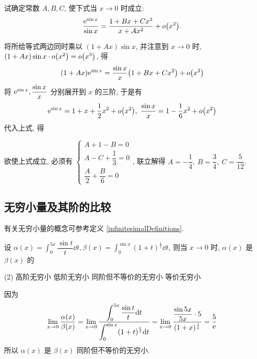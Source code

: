 \begin{example}
    试确定常数 $A,B,C$, 使下式当 $x\to0 $ 时成立:
    $$\dfrac{\mathrm{e}^{\sin x}}{\sin x}=\dfrac{1+Bx+Cx^2}{x+Ax^2}+o\qty(x^2).$$
\end{example}
\begin{solution}
    将所给等式两边同时乘以 $(1+Ax)\sin x$, 并注意到 $x\to0$ 时, $(1+Ax)\sin x\cdot o\qty(x^2)=o\qty(x^3)$, 得
    $$(1+Ax)\mathrm{e}^{\sin x}=\dfrac{\sin x}{x}\qty(1+Bx+Cx^2)+o\qty(x^3)$$
    将 $\mathrm{e}^{\sin x},\dfrac{\sin x}{x}$ 分别展开到 $x$ 的三阶, 于是有
    $$\mathrm{e}^{\sin x}=1+x+\dfrac{1}{2}x^2+o\qty(x^2),~\dfrac{\sin x}{x}=1-\dfrac{1}{6}x^2+o\qty(x^2)$$
    代入上式, 得
    欲使上式成立, 必须有 $\begin{cases}
            A+1-B=0 \\[6pt]A-C+\dfrac{1}{3}=0\\[6pt]\dfrac{A}{2}+\dfrac{B}{6}=0
        \end{cases}$, 联立解得 $A=-\dfrac{1}{4},~B=\dfrac{3}{4},~C=\dfrac{5}{12}.$
\end{solution}

\subsection{无穷小量及其阶的比较}

有关无穷小量的概念可参考定义 \ref{infinitesimalDefinitions}.

\begin{example}[1999 数二]
    设 $\displaystyle \alpha(x)=\int_{0}^{5x} \dfrac{\sin t}{t} \dd t,\beta(x)=\int_{0}^{\sin x} (1+t)^{\frac{1}{t}} \dd t$, 则当 $x \to0$ 时, $\alpha(x)$ 是 $\beta(x)$ 的 
    \begin{tasks}(2)
        \task 高阶无穷小
        \task 低阶无穷小
        \task 同阶但不等价的无穷小
        \task 等价无穷小
    \end{tasks}
\end{example}
\begin{solution}
    因为 $$
    \lim_{x \to 0}\dfrac{\alpha(x)}{\beta(x)}=\lim_{x \to 0}\dfrac{\displaystyle \int_{0}^{5x} \dfrac{\sin t}{t} \dd t}{\displaystyle \int_{0}^{\sin x} (1+t)^{\frac{1}{t}} \dd t}=\lim_{x \to 0}\dfrac{\dfrac{\sin 5x}{5x}\cdot 5}{(1+x)^{\frac{1}{x}}}=\dfrac{5}{\mathrm{e}}
    $$
    所以 $\alpha(x)$ 是 $\beta(x)$ 同阶但不等价的无穷小.
\end{solution}

